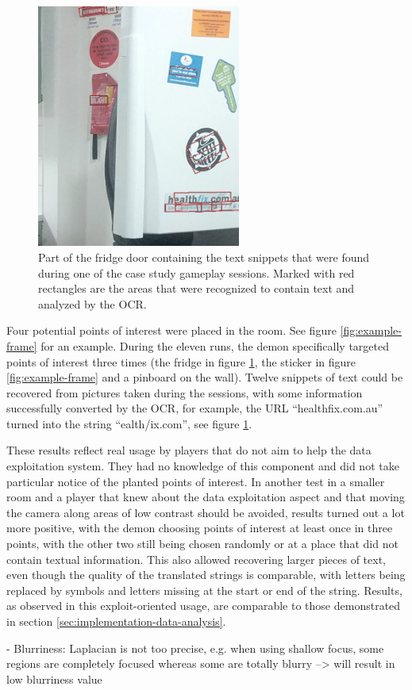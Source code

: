 \begin{figure}
    \includegraphics[height=8cm]{graphics/fridge.png}
    \caption{Part of the fridge door containing the text snippets that were found during one of the case study gameplay sessions. Marked with red rectangles are the areas that were recognized to contain text and analyzed by the OCR.}
    \label{fig:fridge}
\end{figure}

Four potential points of interest were placed in the room. See figure \ref{fig:example-frame} for an example. During the eleven runs, the demon specifically targeted points of interest three times (the fridge in figure \ref{fig:fridge}, the sticker in figure \ref{fig:example-frame} and a pinboard on the wall). 
Twelve snippets of text could be recovered from pictures taken during the sessions, with some information successfully converted by the OCR, for example, the URL \enquote{healthfix.com.au} turned into the string \enquote{ealth/ix.com}, see figure \ref{fig:fridge}.

These results reflect real usage by players that do not aim to help the data exploitation system.
They had no knowledge of this component and did not take particular notice of the planted points of interest.
In another test in a smaller room and a player that knew about the data exploitation aspect and that moving the camera along areas of low contrast should be avoided, results turned out a lot more positive, with the demon choosing points of interest at least once in three points, with the other two still being chosen randomly or at a place that did not contain textual information.
This also allowed recovering larger pieces of text, even though the quality of the translated strings is comparable, with letters being replaced by symbols and letters missing at the start or end of the string.
Results, as observed in this exploit-oriented usage, are comparable to those demonstrated in section \ref{sec:implementation-data-analysis}.

- Blurriness: Laplacian is not too precise, e.g. when using shallow focus, some regions are completely focused whereas some are totally blurry
--> will result in low blurriness value


